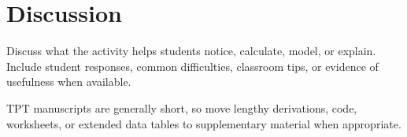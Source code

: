 \section{Discussion}

Discuss what the activity helps students notice, calculate, model, or explain. Include student responses, common difficulties, classroom tips, or evidence of usefulness when available.

TPT manuscripts are generally short, so move lengthy derivations, code, worksheets, or extended data tables to supplementary material when appropriate.
